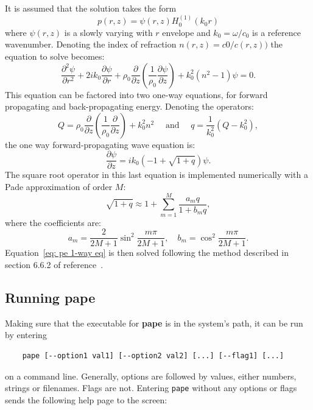 It is assumed that the solution takes the form
\[
p(r,z) = \psi(r,z) H_0^{(1)}(k_0r)
\]
where $\psi(r,z)$ is a slowly varying with $r$ envelope and $k_0 =  {\omega}/ {c_0}$ is a reference wavenumber. Denoting the index of refraction $n(r,z) = c0/c(r,z))$ the equation to solve becomes:
\[
\frac {\partial^2 \psi}{\partial r^2} + 2ik_0 \frac {\partial \psi} {\partial r} 
+ 
\rho_0 \frac {\partial} {\partial z} \left( \frac {1} {\rho_0} \frac {\partial \psi} { \partial z}\right) 
+ 
k_0^2 (n^2 - 1) \psi = 0 . 
\]
This equation can be factored into two one-way equations, for forward propagating and back-propagating energy. Denoting the operators:
\[
Q = \rho_0 \frac {\partial} {\partial z} \left( \frac {1} {\rho_0} \frac {\partial } { \partial z}\right) + k_0^2 n^2  
\quad {\text{  and  } }  \quad
q = \frac {1} { k_0^2} (Q - k_0^2), 
\]
the one way forward-propagating wave equation is:
\begin{equation}
\frac {\partial \psi} {\partial z} = ik_0 \left( -1 + \sqrt {1 + q} \right) \psi .
\label{eq: pe 1-way eq}
\end{equation}
The square root operator in this last equation is implemented numerically with a Pade approximation of order $M$:
\[
\sqrt {1 + q} \approx 1 + \sum_{m=1}^M \frac {a_m q} { 1 + b_m q} , 
\]
where the coefficients are:
\[
a_m = \frac {2} { 2M+1} \sin^2 \frac {m \pi} { 2M + 1}, \quad   b_m =  \cos^2 \frac {m \pi} { 2M + 1}. 
\]
Equation~\ref{eq: pe 1-way eq} is then solved following the method described in section 6.6.2 of reference~\cite{comp_oc_ac}.


\subsection{Running pape}
\label{sec: running pape}

Making sure that the executable for {\bf pape} is in the system's path, it can be run by entering 
\begin{verbatim} 
    pape [--option1 val1] [--option2 val2] [...] [--flag1] [...] 
\end{verbatim}
on a command line. Generally, options are followed by values, either numbers, strings or filenames. Flags are not. Entering \verb"pape" without any options or flags sends the following help page to the screen: 

